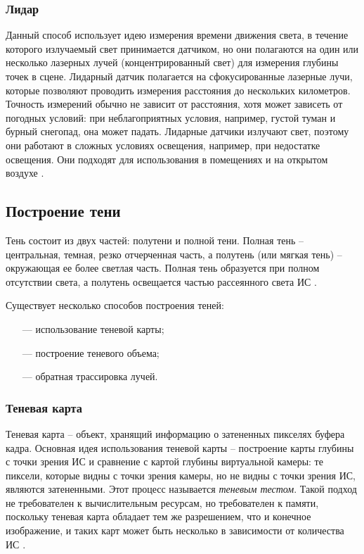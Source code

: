 \subsubsection*{Лидар}

Данный способ использует идею измерения времени движения света, в течение которого излучаемый свет принимается датчиком, но они полагаются на один или несколько лазерных лучей (концентрированный свет) для измерения глубины точек в сцене. Лидарный датчик полагается на сфокусированные лазерные лучи, которые позволяют проводить измерения расстояния до нескольких километров. Точность измерений обычно не зависит от расстояния, хотя может зависеть от погодных условий: при неблагоприятных условия, например, густой туман и бурный снегопад, она может падать. Лидарные датчики излучают свет, поэтому они работают в сложных условиях освещения, например, при недостатке освещения. Они подходят для использования в помещениях и на открытом воздухе \cite{rgbd}.

\subsection*{Построение тени}

Тень состоит из двух частей: полутени и полной тени. Полная тень -- центральная, темная, резко отчерченная часть, а полутень (или мягкая тень) -- окружающая ее более светлая часть. Полная тень образуется при полном отсутствии света, а полутень освещается частью рассеянного света ИС \cite{rogers}.

Существует несколько способов построения теней:

\begin{itemize}
	\item[---] использование теневой карты;
	\item[---] построение теневого объема;
	\item[---] обратная трассировка лучей.
\end{itemize}

\subsubsection*{Теневая карта}

Теневая карта -- объект, хранящий информацию о затененных пикселях буфера кадра. Основная идея использования теневой карты -- построение карты глубины с точки зрения ИС и сравнение с картой глубины виртуальной камеры: те пиксели, которые видны с точки зрения камеры, но не видны с точки зрения ИС, являются затененными. Этот процесс называется \textit{теневым тестом}. Такой подход не требователен к вычислительным ресурсам, но требователен к памяти, поскольку теневая карта обладает тем же разрешением, что и конечное изображение, и таких карт может быть несколько в зависимости от количества ИС \cite{engel2008programming}.

